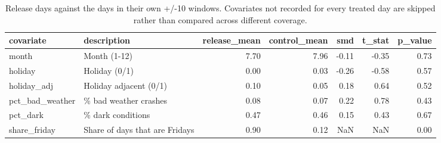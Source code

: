 \begin{table}
\caption{Release days against the days in their own +/-10 windows. Covariates not recorded for every treated day are skipped rather than compared across different coverage.}
\begin{tabular}{llrrrrr}
\toprule
covariate & description & release\_mean & control\_mean & smd & t\_stat & p\_value \\
\midrule
month & Month (1-12) & 7.70 & 7.96 & -0.11 & -0.35 & 0.73 \\
holiday & Holiday (0/1) & 0.00 & 0.03 & -0.26 & -0.58 & 0.57 \\
holiday\_adj & Holiday adjacent (0/1) & 0.10 & 0.05 & 0.18 & 0.64 & 0.52 \\
pct\_bad\_weather & \% bad weather crashes & 0.08 & 0.07 & 0.22 & 0.78 & 0.43 \\
pct\_dark & \% dark conditions & 0.47 & 0.46 & 0.15 & 0.43 & 0.67 \\
share\_friday & Share of days that are Fridays & 0.90 & 0.12 & NaN & NaN & 0.00 \\
\bottomrule
\end{tabular}
\end{table}
